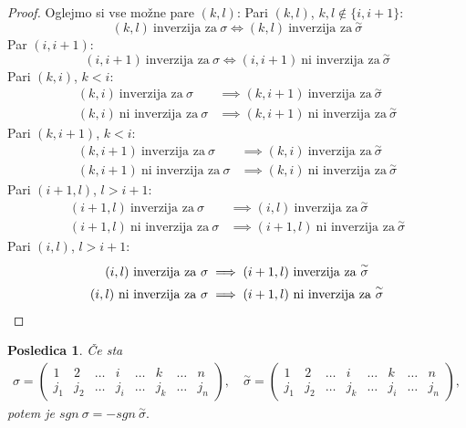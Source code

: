 \documentclass[10pt, a4paper]{article}
\newtheorem{posledica}[izr]{Posledica}
\newenvironment{noticeC}{%
  \tcolorbox[%
  notitle,
  empty,
  enhanced,  %
  breakable,
  coltext=black, 
  fontupper=\rmfamily,
  parbox=false,
  noparskip,
  sharp corners,
  boxrule=-1pt,  %
  frame hidden,
  left=7pt,  %
  right=7pt,
  top=5pt,
  bottom=5pt,
  before skip=2.5ex plus 2pt,
  after skip=2.5ex plus 2pt,
  overlay unbroken and last={%
  },
  ]}
{\endtcolorbox}
\newenvironment{dokaz}%
  {\begin{noticeC}\begin{proof}}%
  {\end{proof}\end{noticeC}}
\begin{document}
\begin{dokaz}
    Oglejmo si vse možne pare $(k,l)$:
        Pari $(k,l)$, $k,l \notin \{i, i+1\}$:
        $$(k,l)\ \text{inverzija za}\ \sigma \iff (k,l)\ \text{inverzija za}\ \overset{\sim}{\sigma}$$
        Par $(i, i+1)$:
        $$(i,i+1)\ \text{inverzija za}\ \sigma \iff (i,i+1)\ \text{ni inverzija za}\ \overset{\sim}{\sigma}$$
        Pari $(k,i)$, $k<i$:
        \begin{align*}
            (k,i)\ \text{inverzija za}\ \sigma &\implies (k,i+1)\ \text{inverzija za}\ \overset{\sim}{\sigma}\\
            (k,i)\ \text{ni inverzija za}\ \sigma &\implies (k,i+1)\ \text{ni inverzija za}\ \overset{\sim}{\sigma}
        \end{align*}
        Pari $(k,i+1)$, $k<i$:
        \begin{align*}
            (k,i+1)\ \text{inverzija za}\ \sigma &\implies (k,i)\ \text{inverzija za}\ \overset{\sim}{\sigma}\\
            (k,i+1)\ \text{ni inverzija za}\ \sigma &\implies (k,i)\ \text{ni inverzija za}\ \overset{\sim}{\sigma}
        \end{align*}
        Pari $(i+1,l)$, $l>i+1$:
        \begin{align*}
            (i+1, l)\ \text{inverzija za}\ \sigma &\implies (i,l)\ \text{inverzija za}\ \overset{\sim}{\sigma}\\
            (i+1, l)\ \text{ni inverzija za}\ \sigma &\implies (i+1, l)\ \text{ni inverzija za}\ \overset{\sim}{\sigma}
        \end{align*}
        Pari $(i,l)$, $l>i+1$:
        \begin{align*}
            (i,l)\ \text{inverzija za}\ \sigma &\implies (i+1,l)\ \text{inverzija za}\ \overset{\sim}{\sigma}\\
            (i,l)\ \text{ni inverzija za}\ \sigma &\implies (i+1,l)\ \text{ni inverzija za}\ \overset{\sim}{\sigma} \qedhere
        \end{align*} 
\end{dokaz}

\begin{posledica}
    Če sta
    \begin{align*}
        \sigma = \begin{pmatrix}
            1 & 2 & \dots & i & \dots & k & \dots & n\\
            j_1 & j_2 & \dots & j_i & \dots & j_{k} & \dots & j_n
        \end{pmatrix},\quad
        \overset{\sim}{\sigma} = \begin{pmatrix}
            1 & 2 & \dots & i & \dots & k & \dots & n\\
            j_1 & j_2 & \dots & j_k & \dots & j_i & \dots & j_n
        \end{pmatrix},
    \end{align*}
    potem je $sgn\ \sigma = - sgn\ \overset{\sim}{\sigma}.$
\end{posledica}
\end{document}
